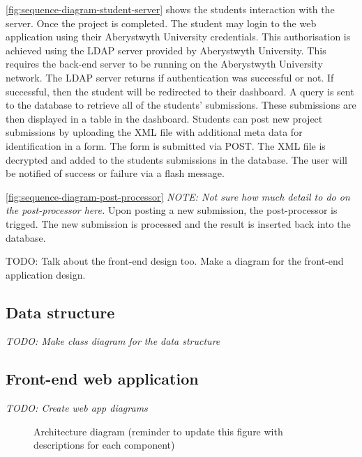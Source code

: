 \autoref{fig:sequence-diagram-student-server} shows the students interaction with the server. Once the project is completed. The student may login to the web application using their Aberystwyth University credentials. This authorisation is achieved using the LDAP server provided by Aberystwyth University. This requires the back-end server to be running on the Aberystwyth University network. The LDAP server returns if authentication was successful or not. If successful, then the student will be redirected to their dashboard. A query is sent to the database to retrieve all of the students' submissions. These submissions are then displayed in a table in the dashboard. Students can post new project submissions by uploading the XML file with additional meta data for identification in a form. The form is submitted via POST. The XML file is decrypted and added to the students submissions in the database. The user will be notified of success or failure via a flash message.

\autoref{fig:sequence-diagram-post-processor} \textit{NOTE: Not sure how much detail to do on the post-processor here.} Upon posting a new submission, the post-processor is trigged. The new submission is processed and the result is inserted back into the database.

TODO: Talk about the front-end design too. Make a diagram for the front-end application design.

\subsection{Data structure}
\textit{TODO: Make class diagram for the data structure}

\subsection{Front-end web application}
\textit{TODO: Create web app diagrams}

\begin{figure}[H]
  \centering
  \caption[Final design architecture diagram]{Architecture diagram (reminder to update this figure with descriptions for each component)}
  \label{fig:architecture-diagram}
\end{figure}

